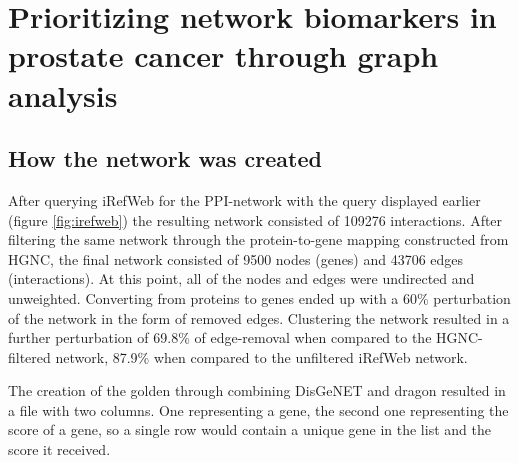 \chapter{Prioritizing network biomarkers in prostate cancer through graph analysis}
\section{How the network was created}
After querying iRefWeb for the PPI-network with the query displayed earlier
(figure \ref{fig:irefweb}) the resulting network consisted of 109276 interactions.
After filtering the same network through the protein-to-gene mapping constructed
from HGNC, the final network consisted of 9500 nodes (genes) and 43706 edges
(interactions). At this point, all of the nodes and edges were undirected and
unweighted. Converting from proteins to genes ended up with a 60\% perturbation
of the network in the form of removed edges. Clustering the network resulted in
a further perturbation of 69.8\% of edge-removal when compared to the
HGNC-filtered network, 87.9\% when compared to the unfiltered iRefWeb network.

The creation of the \gls{golden} through combining DisGeNET and \gls{dragon}
resulted in a file with two columns. One representing a gene, the second one
representing the score of a gene, so a single row would contain a unique gene in
the list and the score it received.

